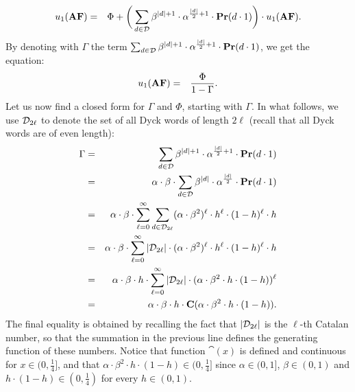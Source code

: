 %
\begin{eqnarray*}
 u_1(\text{\rm {\bf AF}}) & = & \Phi + 
 \bigg(\sum_{d\in \mathcal{D}} \beta^{|d|+1}\cdot  \alpha^{\frac{|d|}{2}+1}\cdot \mathbf{Pr}(d\cdot 1)\bigg) \cdot  u_1(\text{\rm {\bf AF}}).
\end{eqnarray*}
%
By denoting with $\Gamma$ the term $\sum_{d\in \mathcal{D}} \beta^{|d|+1}\cdot  \alpha^{\frac{|d|}{2}+1}\cdot \mathbf{Pr}(d\cdot 1)$, we get the equation:
\begin{eqnarray*}
u_1(\text{\rm {\bf AF}}) & = &  \frac{\Phi}{1-\Gamma}.
\end{eqnarray*}
Let us now find a closed form for $\Gamma$ and $\Phi$, starting with $\Gamma$. In what follows, we use $\mathcal{D}_{2\ell}$ to denote the set of all Dyck words of length $2\ell$ (recall that all Dyck words are of even length):
%
\begin{eqnarray*}
\Gamma & = & \sum_{d\in \mathcal{D}} \beta^{|d|+1}\cdot  \alpha^{\frac{|d|}{2}+1}\cdot \mathbf{Pr}(d\cdot 1)\\
 & = & \alpha\cdot \beta \cdot \sum_{d\in \mathcal{D}} \beta^{|d|}\cdot  \alpha^{\frac{|d|}{2}}\cdot \mathbf{Pr}(d\cdot 1) \\
  & = & \alpha\cdot \beta \cdot \sum_{\ell = 0}^{\infty} \sum_{d\in \mathcal{D}_{2\ell}} (\alpha\cdot \beta^2)^{\ell}\cdot h^{\ell}\cdot (1-h)^{\ell}\cdot h\\
   & = &  \alpha\cdot \beta \cdot \sum_{\ell = 0}^{\infty} |\mathcal{D}_{2\ell}| \cdot (\alpha\cdot \beta^2)^{\ell}\cdot h^{\ell}\cdot (1-h)^{\ell}\cdot h\\
   & = &  \alpha\cdot \beta \cdot h \cdot \sum_{\ell = 0}^{\infty} |\mathcal{D}_{2\ell}| \cdot (\alpha\cdot \beta^2 \cdot h \cdot (1-h))^{\ell}\\
    & = &  \alpha\cdot \beta \cdot h \cdot \mathbf{C}(\alpha\cdot\beta^2 \cdot h \cdot (1-h)).
\end{eqnarray*}
%
The final equality is obtained by recalling the fact that $|\mathcal{D}_{2\ell}|$ is the $\ell$-th Catalan number, so that the summation in the previous line defines the generating function of these numbers. Notice that function $\cat(x)$ is defined and continuous for $x \in (0,\frac{1}{4}]$, and that $\alpha\cdot\beta^2 \cdot h \cdot (1-h) \in (0,\frac{1}{4}] $ since $\alpha \in (0,1]$, $\beta \in (0,1)$ and $h\cdot(1-h)\in (0,\frac{1}{4})$ for every $h\in(0,1)$.


